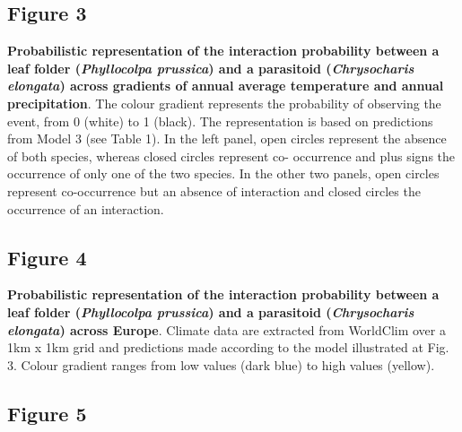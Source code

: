\documentclass[12pt]{article}
\begin{document}
\subsection*{Figure 3}

\textbf{Probabilistic representation of the interaction probability between a
leaf folder (\textit{Phyllocolpa prussica}) and a parasitoid
(\textit{Chrysocharis elongata}) across gradients of annual average
temperature and annual precipitation}. The colour gradient represents the
probability of observing the event, from 0 (white) to 1 (black). The
representation is based on predictions from Model 3 (see Table 1). In the left
panel, open circles represent the absence of both species, whereas closed
circles represent co- occurrence and plus signs the occurrence of only one of
the two species. In the other two panels, open circles represent co-occurrence
but an absence of interaction and closed circles the occurrence of an
interaction.

\subsection*{Figure 4}

\textbf{Probabilistic representation of the interaction probability between a
leaf folder (\textit{Phyllocolpa prussica}) and a parasitoid
(\textit{Chrysocharis elongata}) across Europe}. Climate data are extracted
from WorldClim over a 1km x 1km grid and predictions made according to the
model illustrated at Fig. 3. Colour gradient ranges from low values (dark
blue) to high values (yellow).



\subsection*{Figure 5}
\end{document}
